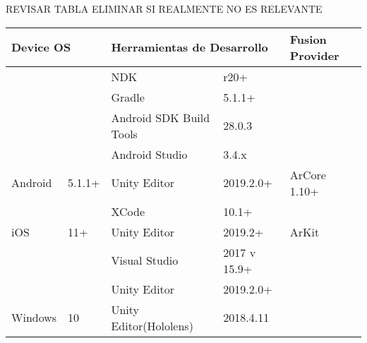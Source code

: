 REVISAR TABLA   ELIMINAR SI REALMENTE NO ES RELEVANTE
\begin{table}[]
	\begin{tabular}{|l|l|l|l|l|l|}
		\hline
		\multicolumn{2}{|l|}{Device OS}                       & \multicolumn{2}{l|}{Herramientas de Desarrollo}                                             & \multicolumn{2}{l|}{Fusion Provider}                \\ \hline
		&                          & NDK                                            & r20+                                       &                                &                    \\ \cline{3-4}
		&                          & \cellcolor[HTML]{EFEFEF}Gradle                 & \cellcolor[HTML]{EFEFEF}5.1.1+             &                                &                    \\ \cline{3-4}
		&                          & Android SDK Build Tools                        & 28.0.3                                     &                                &                    \\ \cline{3-4}
		&                          & \cellcolor[HTML]{EFEFEF}Android Studio         & \cellcolor[HTML]{EFEFEF}3.4.x              &                                &                    \\ \cline{3-4}
		\multirow{-5}{*}{Android}  & \multirow{-5}{*}{5.1.1+} & Unity Editor                                   & 2019.2.0+                                  & \multirow{-5}{*}{ArCore 1.10+} & \multirow{-5}{*}{} \\ \hline
		&                          & \cellcolor[HTML]{EFEFEF}XCode                  & \cellcolor[HTML]{EFEFEF}10.1+              & \multicolumn{2}{l|}{}                               \\ \cline{3-4}
		\multirow{-2}{*}{iOS}      & \multirow{-2}{*}{11+}    & Unity Editor                                   & 2019.2+                                    & \multicolumn{2}{l|}{\multirow{-2}{*}{ArKit}}        \\ \hline
		&                          & \cellcolor[HTML]{EFEFEF}Visual Studio          & \cellcolor[HTML]{EFEFEF}2017 v 15.9+ & \multicolumn{2}{l|}{}                               \\ \cline{3-4}
		&                          & Unity Editor                                   & 2019.2.0+                                  & \multicolumn{2}{l|}{}                               \\ \cline{3-4}
		\multirow{-3}{*}{Windows}  & \multirow{-3}{*}{10}     & \cellcolor[HTML]{EFEFEF}Unity Editor(Hololens) & \cellcolor[HTML]{EFEFEF}2018.4.11          & \multicolumn{2}{l|}{\multirow{-3}{*}{}}             \\ \hline

\end{tabular}
\end{table}
